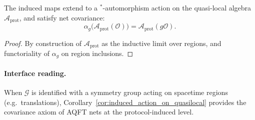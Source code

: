 \begin{corollary}
\label{cor:induced_action_on_quasilocal}
\MathTag The induced maps extend to a $^\ast$-automorphism action on the quasi-local algebra $\mathcal{A}_{\mathrm{prot}}$, and satisfy net covariance:
\[
\alpha_g\bigl(\mathcal{A}_{\mathrm{prot}}(\mathcal{O})\bigr)=\mathcal{A}_{\mathrm{prot}}(g\mathcal{O}).
\]
\end{corollary}
\begin{proof}
By construction of $\mathcal{A}_{\mathrm{prot}}$ as the inductive limit over regions, and functoriality of $\alpha_g$ on region inclusions.
\end{proof}

\paragraph{Interface reading.}
\InterfaceTag When $\mathcal{G}$ is identified with a symmetry group acting on spacetime regions (e.g.\ translations), Corollary~\ref{cor:induced_action_on_quasilocal} provides the covariance axiom of AQFT nets at the protocol-induced level.

